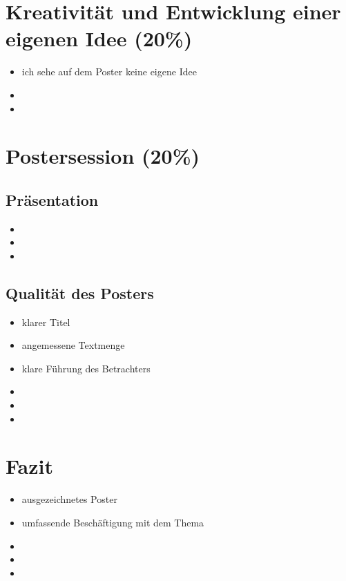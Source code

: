 \documentclass[german,headsepline]{scrartcl}
\begin{document}
\section{Kreativität und Entwicklung einer eigenen Idee (20\%)}
\begin{itemize}
  \item ich sehe auf dem Poster keine eigene Idee
  \item 
  \item
\end{itemize}

\section{Postersession (20\%)}

\subsection{Präsentation}
\begin{itemize}
  \item 
  \item 
  \item
\end{itemize}

\subsection{Qualität des Posters}
\begin{itemize}
  \item klarer Titel
  \item angemessene Textmenge
  \item klare Führung des Betrachters
  \item
  \item
  \item
\end{itemize}

\section{Fazit}
\begin{itemize}
  \item ausgezeichnetes Poster
  \item umfassende Beschäftigung mit dem Thema
  \item
  \item
  \item
\end{itemize}
\end{document}
